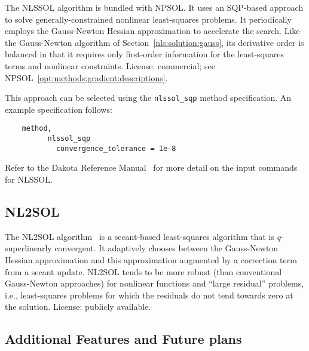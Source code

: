 The NLSSOL algorithm is bundled with NPSOL. It uses an SQP-based
approach to solve generally-constrained nonlinear least-squares
problems. It periodically employs the Gauss-Newton Hessian
approximation to accelerate the search. Like the Gauss-Newton
algorithm of Section~\ref{nls:solution:gauss}, its derivative order is
balanced in that it requires only first-order information for the
least-squares terms and nonlinear constraints. License: commercial;
see NPSOL~\ref{opt:methods:gradient:descriptions}.

This approach can be selected using the \texttt{nlssol\_sqp} method
specification. An example specification follows:
\begin{small}
\begin{verbatim}
    method,
          nlssol_sqp
            convergence_tolerance = 1e-8
\end{verbatim}
\end{small}

Refer to the Dakota Reference Manual~\cite{RefMan} for more detail on the
input commands for NLSSOL.

\subsection{NL2SOL}\label{nls:solution:nl2sol}

The NL2SOL algorithm~\cite{Den81} is a secant-based least-squares
algorithm that is $q$-superlinearly convergent. It adaptively chooses
between the Gauss-Newton Hessian approximation and this approximation
augmented by a correction term from a secant update. NL2SOL tends to
be more robust (than conventional Gauss-Newton approaches) for
nonlinear functions and ``large residual'' problems, i.e.,
least-squares problems for which the residuals do not tend towards
zero at the solution. License: publicly available.

\subsection{Additional Features and Future plans}\label{nls:solution:future}

